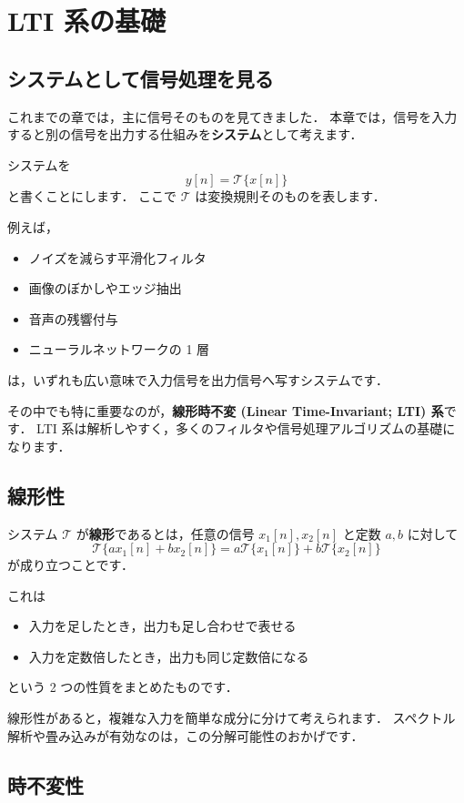 \chapter{LTI 系の基礎}


\section{システムとして信号処理を見る}

これまでの章では，主に信号そのものを見てきました．
本章では，信号を入力すると別の信号を出力する仕組みを\textbf{システム}として考えます．

システムを
\[
y[n] = \mathcal{T}\{x[n]\}
\]
と書くことにします．
ここで $\mathcal{T}$ は変換規則そのものを表します．

例えば，
\begin{itemize}
\item ノイズを減らす平滑化フィルタ
\item 画像のぼかしやエッジ抽出
\item 音声の残響付与
\item ニューラルネットワークの 1 層
\end{itemize}
は，いずれも広い意味で入力信号を出力信号へ写すシステムです．

その中でも特に重要なのが，\textbf{線形時不変 (Linear Time-Invariant; LTI) 系}です．
LTI 系は解析しやすく，多くのフィルタや信号処理アルゴリズムの基礎になります．


\section{線形性}

システム $\mathcal{T}$ が\textbf{線形}であるとは，任意の信号 $x_1[n], x_2[n]$ と定数 $a, b$ に対して
\[
\mathcal{T}\{a x_1[n] + b x_2[n]\}
= a\mathcal{T}\{x_1[n]\} + b\mathcal{T}\{x_2[n]\}
\]
が成り立つことです．

これは
\begin{itemize}
\item 入力を足したとき，出力も足し合わせで表せる
\item 入力を定数倍したとき，出力も同じ定数倍になる
\end{itemize}
という 2 つの性質をまとめたものです．

線形性があると，複雑な入力を簡単な成分に分けて考えられます．
スペクトル解析や畳み込みが有効なのは，この分解可能性のおかげです．


\section{時不変性}

